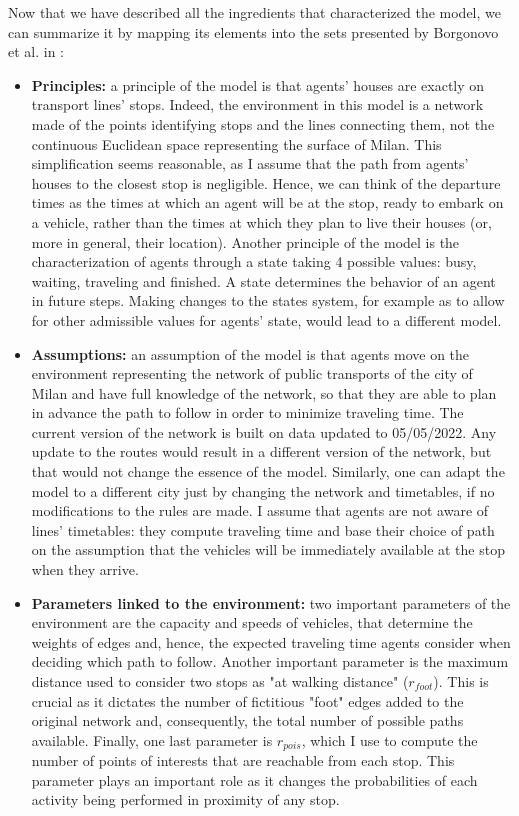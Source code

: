 Now that we have described all the ingredients that characterized the model, we can summarize it by mapping its elements into the sets presented by Borgonovo et al. in \cite{Borgonovo2022SensitivityAO}:
\begin{itemize}
\item \textbf{Principles:} a principle of the model is that agents' houses are exactly on transport lines' stops. Indeed, the environment in this model is a network made of the points identifying stops and the lines connecting them, not the continuous Euclidean space representing the surface of Milan. This simplification seems reasonable, as I assume that the path from agents' houses to the closest stop is negligible. Hence, we can think of the departure times as the times at which an agent will be at the stop, ready to embark on a vehicle, rather than the times at which they plan to live their houses (or, more in general, their location). Another principle of the model is the characterization of agents through a state taking 4 possible values: busy, waiting, traveling and finished. A state determines the behavior of an agent in future steps. Making changes to the states system, for example as to allow for other admissible values for agents' state, would lead to a different model. 
\item \textbf{Assumptions:} an assumption of the model is that agents move on the environment representing the network of public transports of the city of Milan and have full knowledge of the network, so that they are able to plan in advance the path to follow in order to minimize traveling time. The current version of the network is built on data updated to 05/05/2022. Any update to the routes would result in a different version of the network, but that would not change the essence of the model. Similarly, one can adapt the model to a different city just by changing the network and timetables, if no modifications to the rules are made. I assume that agents are not aware of lines' timetables: they compute traveling time and base their choice of path on the assumption that the vehicles will be immediately available at the stop when they arrive.
\item \textbf{Parameters linked to the environment:} two important parameters of the environment are the capacity and speeds of vehicles, that determine the weights of edges and, hence, the expected traveling time agents consider when deciding which path to follow. Another important parameter is the maximum distance used to consider two stops as "at walking distance" ($r_{foot}$). This is crucial as it dictates the number of fictitious "foot" edges added to the original network and, consequently, the total number of possible paths available. Finally, one last parameter is $r_{pois}$, which I use to compute the number of points of interests that are reachable from each stop. This parameter plays an important role as it changes the probabilities of each activity being performed in proximity of any stop.

\end{itemize}
